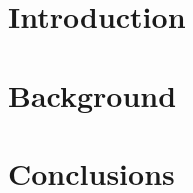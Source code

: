 \documentclass[twoside,11pt]{report}
\begin{document}
	\begin{comment}
		\ititle{My Title}
		\isubtitle{My Subtitle}
		\iauthor{Me and Myself}
		\idate{2004}
		\irefnr{IR-EE-SB 2000:099}
		\iaddress{Signal Processing\\
		School of Electrical Engineering\\
		Kungliga Tekniska Hgskolan}
		\makeititle
	\end{comment}
	
	\begin{comment}
		\chapter*{Abstract}
		\chapter*{Dedication}
		\chapter*{Acknowledgements}
	\end{comment}
	\tableofcontents

	\chapter{Introduction}
	
	\chapter{Background}
	
	\chapter{Conclusions}

	
\end{document}
